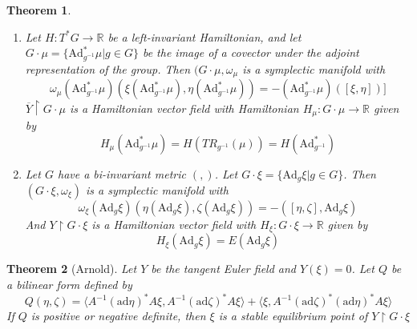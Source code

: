 \documentclass{article}
\newtheorem{thm}{Theorem}
\begin{document}
\begin{thm}
\begin{enumerate}
    \item Let $H: T^*G \to \mathbb{R}$ be a left-invariant Hamiltonian, and let $G \cdot \mu = \{\mathrm{Ad}^*_{g^{-1}} \mu \vert g \in G \}$ be the image of a covector under the adjoint representation of the group. Then $(G \cdot \mu, \omega_{\mu}$ is a symplectic manifold with 
    \begin{equation}\omega_{\mu}(\mathrm{Ad}^*_{g^{-1}} \mu)\left(\xi (\mathrm{Ad}^*_{g^{-1}}\mu), \eta (\mathrm{Ad}^*_{g^{-1}}\mu) \right) = - \left( \mathrm{Ad}^*_{g^{-1}}\mu \right) ([\xi, \eta])]\end{equation}
    $\overline{Y}\restriction G \cdot \mu$ is a Hamiltonian vector field with Hamiltonian $H_{\mu}:G\cdot \mu \to \mathbb{R}$ given by 
    \begin{equation}H_{\mu}\left( \mathrm{Ad}^*_{g^{-1}} \mu \right) = H \left( TR_{g^{-1}} (\mu) \right) = H \left( \mathrm{Ad}^*_{g^{-1}} \right)\end{equation}
    \item Let $G$ have a bi-invariant metric $(,)$. Let $G \cdot \xi = \{ \mathrm{Ad}_g \xi \vert g \in G \}$. Then $(G \cdot \xi, \omega_{\xi})$ is a symplectic manifold with 
    \begin{equation}\omega_{\xi} \left( \mathrm{Ad}_g \xi \right) \left( \eta (\mathrm{Ad}_g \xi ), \zeta (\mathrm{Ad}_g \xi) \right) = -\left( [\eta, \zeta], \mathrm{Ad}_g \xi \right)\end{equation}
    And $Y \restriction G \cdot \xi$ is a Hamiltonian vector field with $H_{\xi}:G \cdot \xi \to \mathbb{R}$ given by
    \begin{equation}H_{\xi} \left( \mathrm{Ad}_g \xi \right) = E \left( \mathrm{Ad}_g \xi \right)\end{equation}
\end{enumerate}
\end{thm}

\begin{thm}[Arnold]

Let $Y$ be the tangent Euler field and $Y(\xi)=0$. Let $Q$ be a bilinear form defined by 
\begin{equation}Q(\eta, \zeta) = \langle A^{-1} (\mathrm{ad}\eta)^* A \xi, A^{-1}(\mathrm{ad}\zeta)^* A \xi \rangle + \langle \xi, A^{-1} (\mathrm{ad}\zeta)^* (\mathrm{ad}\eta)^* A \xi \rangle\end{equation}
If $Q$ is positive or negative definite, then $\xi$ is a stable equilibrium point of $Y \restriction G \cdot \xi$
\end{thm}
\end{document}
